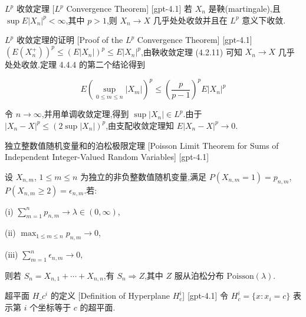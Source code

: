 \documentclass[UTF8]{ctexart}
\begin{document}
    
    
    \begin{thm}
        {$L^p$ 收敛定理}
        [$L^p$ Convergence Theorem]
        [gpt-4.1]
        若 $X_n$ 是鞅(martingale),且 $\sup E |X_n|^p < \infty$,其中 $p > 1$,则 $X_n \to X$ 几乎处处收敛并且在 $L^p$ 意义下收敛.
    \end{thm}
    
    
    
    \begin{prf}
        {$L^p$ 收敛定理的证明}
        [Proof of the $L^p$ Convergence Theorem]
        [gpt-4.1]
        $(E (X_n^+))^p \leq (E |X_n|)^p \leq E |X_n|^p$,由鞅收敛定理 (4.2.11) 可知 $X_n \to X$ 几乎处处收敛.定理 4.4.4 的第二个结论得到

\[
E \left( \sup_{0 \leq m \leq n} |X_m| \right)^p \leq \left( \frac{p}{p-1} \right)^p E |X_n|^p
\]

令 $n \to \infty$,并用单调收敛定理,得到 $\sup |X_n| \in L^p$.由于 $|X_n - X|^p \leq (2 \sup |X_n|)^p$,由支配收敛定理知 $E |X_n - X|^p \to 0$.
    \end{prf}
    
    
    
    \begin{thm}
        {独立整数值随机变量和的泊松极限定理}
        [Poisson Limit Theorem for Sums of Independent Integer-Valued Random Variables]
        [gpt-4.1]
        
设 $X_{n,m}$, $1 \leq m \leq n$ 为独立的非负整数值随机变量,满足 $P(X_{n,m} = 1) = p_{n,m}$,$P(X_{n,m} \geq 2) = \epsilon_{n,m}$.若:

(i) $\sum_{m=1}^{n} p_{n,m} \to \lambda \in (0, \infty)$,

(ii) $\max_{1 \leq m \leq n} p_{n,m} \to 0$,

(iii) $\sum_{m=1}^{n} \epsilon_{n,m} \to 0$,

则若 $S_n = X_{n,1} + \cdots + X_{n,n}$,有 $S_n \Rightarrow Z$,其中 $Z$ 服从泊松分布 $\mathrm{Poisson}(\lambda)$.

    \end{thm}
    
    
    
    \begin{dfn}
        {超平面 $H\_c^i$ 的定义}
        [Definition of Hyperplane $H_c^i$]
        [gpt-4.1]
        令 $H_c^i = \{ x : x_i = c \}$ 表示第 $i$ 个坐标等于 $c$ 的超平面.
    \end{dfn}
    
\end{document}
